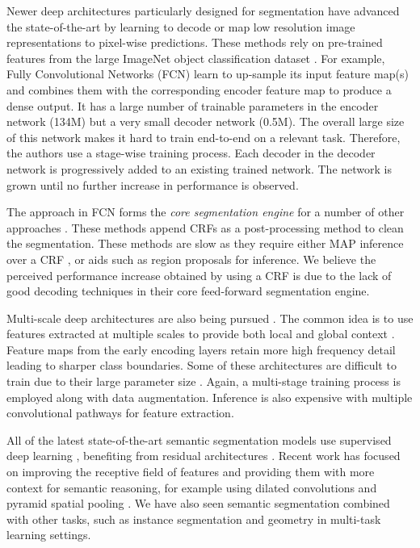 Newer deep architectures \citep{long2015fully,NohDeconvNets,eigen2015predicting,DecoupledNet,CRFRNN} particularly designed for segmentation have advanced the state-of-the-art by learning to decode or map low resolution image representations to pixel-wise predictions. These methods rely on pre-trained features from the large ImageNet object classification dataset \citep{deng2009imagenet}. For example, Fully Convolutional Networks (FCN) \citep{long2015fully} learn to up-sample its input feature map(s) and combines them with the corresponding encoder feature map to produce a dense output. It has a large number of trainable parameters in the encoder network (134M) but a very small decoder network (0.5M). The overall large size of this network makes it hard to train end-to-end on a relevant task. Therefore, the authors use a stage-wise training process. Each decoder in the decoder network is progressively added to an existing trained network. The network is grown until no further increase in performance is observed. 

The approach in FCN forms the \textit{core segmentation engine} for a number of other approaches \citep{ParseNetRabinovich,UrtasunSegmentation,CRFRNN,chen2016deeplab}. These methods append CRFs as a post-processing method to clean the segmentation. These methods are slow as they require either MAP inference over a CRF \citep{lin2015efficient}, \citep{UrtasunSegmentation} or aids such as region proposals \citep{NohDeconvNets} for inference. We believe the perceived performance increase obtained by using a CRF is due to the lack of good decoding techniques in their core feed-forward segmentation engine. 

Multi-scale deep architectures are also being pursued \citep{eigen2015predicting,lin2015efficient,hariharan2015hypercolumns,ParseNetRabinovich}. The common idea is to use features extracted at multiple scales to provide both local and global context \citep{mostajabi2014feedforward}. Feature maps from the early encoding layers retain more high frequency detail leading to sharper class boundaries. Some of these architectures are difficult to train due to their large parameter size \citep{eigen2015predicting}. Again, a multi-stage training process is employed along with data augmentation. Inference is also expensive with multiple convolutional pathways for feature extraction.

All of the latest state-of-the-art semantic segmentation models use supervised deep learning \citep{badrinarayanan2017segnet,long2015fully}, benefiting from residual architectures \citep{he2016deep,huang2017densely}. Recent work has focused on improving the receptive field of features and providing them with more context for semantic reasoning, for example using dilated convolutions \citep{YuKoltun2016} and pyramid spatial pooling \citep{zhao2017pspnet}. We have also seen semantic segmentation combined with other tasks, such as instance segmentation \citep{he2017maskrcnn} and geometry \citep{kendall2017multi} in multi-task learning settings.

